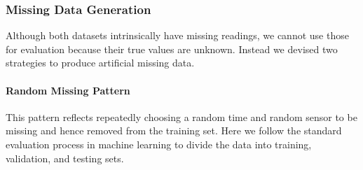 




\subsubsection{Missing Data Generation}


Although both datasets intrinsically have missing readings, we cannot use those for evaluation because their true values are unknown.
Instead we devised two strategies to produce artificial missing data.
\paragraph*{Random Missing Pattern}

This pattern reflects repeatedly choosing a random time and random sensor to be missing and hence removed from the training set.
Here we follow the standard evaluation process in machine learning to divide the data into training, validation, and testing sets.

